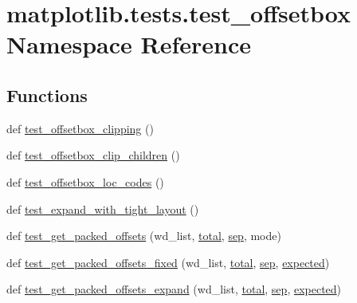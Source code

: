 \hypertarget{namespacematplotlib_1_1tests_1_1test__offsetbox}{}\section{matplotlib.\+tests.\+test\+\_\+offsetbox Namespace Reference}
\label{namespacematplotlib_1_1tests_1_1test__offsetbox}
\subsection*{Functions}
\begin{DoxyCompactItemize}
\item 
def \hyperlink{namespacematplotlib_1_1tests_1_1test__offsetbox_af5ca1d686f6f149c4ce827dd9e171f53}{test\+\_\+offsetbox\+\_\+clipping} ()
\item 
def \hyperlink{namespacematplotlib_1_1tests_1_1test__offsetbox_a830efc5bdb3fcf02be851c7f1873440c}{test\+\_\+offsetbox\+\_\+clip\+\_\+children} ()
\item 
def \hyperlink{namespacematplotlib_1_1tests_1_1test__offsetbox_a0a8159792eab3a5a410c2dea5dc85d88}{test\+\_\+offsetbox\+\_\+loc\+\_\+codes} ()
\item 
def \hyperlink{namespacematplotlib_1_1tests_1_1test__offsetbox_a42f8c8c8b4ffdc9ff45426dfb084538d}{test\+\_\+expand\+\_\+with\+\_\+tight\+\_\+layout} ()
\item 
def \hyperlink{namespacematplotlib_1_1tests_1_1test__offsetbox_a177df6c47849b140b16e94e1f10cc1dc}{test\+\_\+get\+\_\+packed\+\_\+offsets} (wd\+\_\+list, \hyperlink{namespacematplotlib_1_1tests_1_1test__offsetbox_a0a4b466093ae57e6600683cc22629c86}{total}, \hyperlink{namespacematplotlib_1_1tests_1_1test__offsetbox_afd15cd9b9929a629b0337df5a5b03397}{sep}, mode)
\item 
def \hyperlink{namespacematplotlib_1_1tests_1_1test__offsetbox_a2660550d9db40d42fdd2e867dfd81b64}{test\+\_\+get\+\_\+packed\+\_\+offsets\+\_\+fixed} (wd\+\_\+list, \hyperlink{namespacematplotlib_1_1tests_1_1test__offsetbox_a0a4b466093ae57e6600683cc22629c86}{total}, \hyperlink{namespacematplotlib_1_1tests_1_1test__offsetbox_afd15cd9b9929a629b0337df5a5b03397}{sep}, \hyperlink{namespacematplotlib_1_1tests_1_1test__offsetbox_a5927cc5d31f916316136b0fe08599715}{expected})
\item 
def \hyperlink{namespacematplotlib_1_1tests_1_1test__offsetbox_ae7a17f057b00685ec9cc76b55ff87e51}{test\+\_\+get\+\_\+packed\+\_\+offsets\+\_\+expand} (wd\+\_\+list, \hyperlink{namespacematplotlib_1_1tests_1_1test__offsetbox_a0a4b466093ae57e6600683cc22629c86}{total}, \hyperlink{namespacematplotlib_1_1tests_1_1test__offsetbox_afd15cd9b9929a629b0337df5a5b03397}{sep}, \hyperlink{namespacematplotlib_1_1tests_1_1test__offsetbox_a5927cc5d31f916316136b0fe08599715}{expected})

\end{DoxyCompactItemize}
